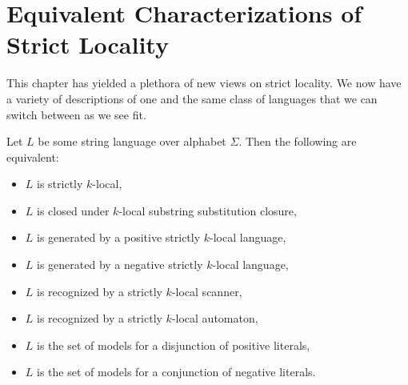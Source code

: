 \section{Equivalent Characterizations of Strict Locality}

This chapter has yielded a plethora of new views on strict locality.
We now have a variety of descriptions of one and the same class of languages that we can switch between as we see fit.

\begin{theorem}
    Let $L$ be some string language over alphabet $\Sigma$.
    Then the following are equivalent:
    \begin{itemize}
        \item $L$ is strictly $k$-local,
        \item $L$ is closed under $k$-local substring substitution closure,
        \item $L$ is generated by a positive strictly $k$-local language,
        \item $L$ is generated by a negative strictly $k$-local language,
        \item $L$ is recognized by a strictly $k$-local scanner,
        \item $L$ is recognized by a strictly $k$-local automaton,
        \item $L$ is the set of models for a disjunction of positive literals,
        \item $L$ is the set of models for a conjunction of negative literals.
    \end{itemize}
\end{theorem}
%
